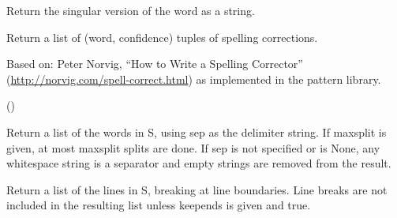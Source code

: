\documentclass[letterpaper,10pt,english]{sphinxmanual}
\begin{document}
\begin{fulllineitems}

\begin{fulllineitems}
\label{api_reference:textblob_de.blob.Word.singularize}
Return the singular version of the word as a string.

\end{fulllineitems}


\begin{fulllineitems}
\label{api_reference:textblob_de.blob.Word.spellcheck}
Return a list of (word, confidence) tuples of spelling corrections.

Based on: Peter Norvig, ``How to Write a Spelling Corrector''
(\href{http://norvig.com/spell-correct.html}{http://norvig.com/spell-correct.html}) as implemented in the pattern
library.

()

\end{fulllineitems}


\begin{fulllineitems}
\label{api_reference:textblob_de.blob.Word.split}
Return a list of the words in S, using sep as the
delimiter string.  If maxsplit is given, at most maxsplit
splits are done. If sep is not specified or is None, any
whitespace string is a separator and empty strings are
removed from the result.

\end{fulllineitems}


\begin{fulllineitems}
\label{api_reference:textblob_de.blob.Word.splitlines}
Return a list of the lines in S, breaking at line boundaries.
Line breaks are not included in the resulting list unless keepends
is given and true.

\end{fulllineitems}


\end{fulllineitems}
\end{document}
